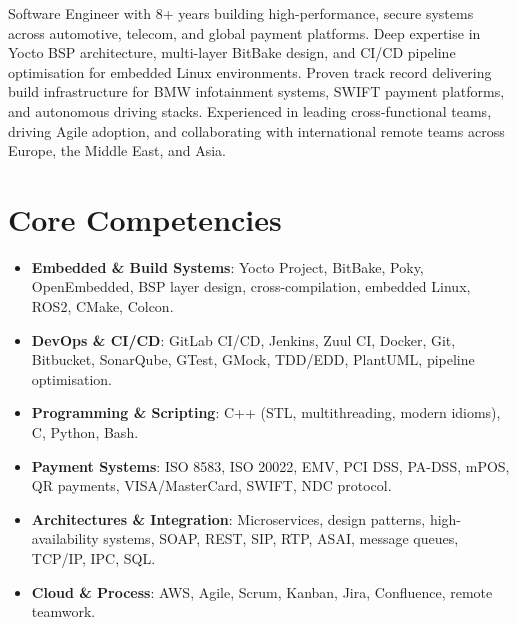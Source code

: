 \documentclass[11pt,a4paper,sans]{moderncv}
\begin{document}
\makecvtitle


\vspace{6pt}
\small{Software Engineer with 8+ years building high-performance, secure systems across automotive, telecom, and global payment platforms. Deep expertise in Yocto BSP architecture, multi-layer BitBake design, and CI/CD pipeline optimisation for embedded Linux environments. Proven track record delivering build infrastructure for BMW infotainment systems, SWIFT payment platforms, and autonomous driving stacks. Experienced in leading cross-functional teams, driving Agile adoption, and collaborating with international remote teams across Europe, the Middle East, and Asia.}


\section{Core Competencies}
\vspace{1pt}
\begin{itemize}

\item \textbf{Embedded \& Build Systems}: Yocto Project, BitBake, Poky, OpenEmbedded, BSP layer design, cross-compilation, embedded Linux, ROS2, CMake, Colcon.

\item \textbf{DevOps \& CI/CD}: GitLab CI/CD, Jenkins, Zuul CI, Docker, Git, Bitbucket, SonarQube, GTest, GMock, TDD/EDD, PlantUML, pipeline optimisation.

\item \textbf{Programming \& Scripting}: C++ (STL, multithreading, modern idioms), C, Python, Bash.

\item \textbf{Payment Systems}: ISO 8583, ISO 20022, EMV, PCI DSS, PA-DSS, mPOS, QR payments, VISA/MasterCard, SWIFT, NDC protocol.

\item \textbf{Architectures \& Integration}: Microservices, design patterns, high-availability systems, SOAP, REST, SIP, RTP, ASAI, message queues, TCP/IP, IPC, SQL.

\item \textbf{Cloud \& Process}: AWS, Agile, Scrum, Kanban, Jira, Confluence, remote teamwork.

\end{itemize}
\end{document}
